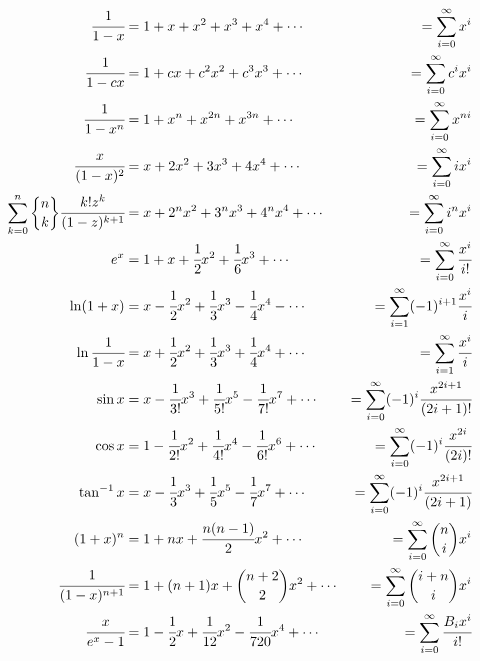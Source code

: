 {\allowdisplaybreaks
\begin{align*}
\cfrac{1}{1 - x}  &=  1 + x + x^2 + x^3 + x^4 + \cdots    &=  \sum_{i=0}^\infty x^i \\
\cfrac{1}{1 - c x}  &=  1 + c x + c^2 x^2 + c^3 x^3 + \cdots  &=  \sum_{i=0}^\infty c^i x^i \\
\cfrac{1}{1 - x^n}  &=  1 + x^n + x^{2n} + x^{3n} + \cdots    &=  \sum_{i=0}^\infty x^{ni} \\
\cfrac{x}{(1 - x)^2}&=  x + 2 x^2 + 3 x^3 + 4 x^4 + \cdots    &=  \sum_{i=0}^\infty i x^i \\
\sum_{k=0}^n \stls{n}{k} \cfrac{k! z^k}{(1-z)^{k+1}}
          &=  x + 2^n x^2 + 3^n x^3 + 4^n x^4 + \cdots
                                &=  \sum_{i=0}^\infty i^n x^i \\
e^x          &= 1 + x + \cfrac{1}{2} x^2 + \cfrac{1}{6} x^3 + \cdots
                                &=  \sum_{i=0}^\infty \cfrac{x^i}{i!} \\
\ln (1 + x)      &=  x - \cfrac{1}{2} x^2 + \cfrac{1}{3} x^3 - \cfrac{1}{4} x^4  - \cdots
                                &=  \sum_{i=1}^\infty (-1)^{i+1} \cfrac{x^i}{i} \\
\ln \cfrac{1}{1 - x}
          &=  x + \cfrac{1}{2} x^2 + \cfrac{1}{3} x^3 + \cfrac{1}{4} x^4  + \cdots
                                &=  \sum_{i=1}^\infty \cfrac{x^i}{i} \\
\sin x        &=  x - \cfrac{1}{3!} x^3  + \cfrac{1}{5!} x^5 - \cfrac{1}{7!} x^7 +  \cdots
                                &=  \sum_{i=0}^\infty (-1)^i \cfrac{x^{2i+1}}{(2i+1)!} \\
\cos x        &=  1 - \cfrac{1}{2!} x^2  + \cfrac{1}{4!} x^4 - \cfrac{1}{6!} x^6 +  \cdots
                                &=  \sum_{i=0}^\infty (-1)^i \cfrac{x^{2i}}{(2i)!} \\
\tan^{-1} x      &=  x - \cfrac{1}{3} x^3  + \cfrac{1}{5} x^5 - \cfrac{1}{7} x^7 +  \cdots
                                &=  \sum_{i=0}^\infty (-1)^i \cfrac{x^{2i+1}}{(2i+1)} \\
(1+x)^n        &=  1 + n x + \cfrac{n(n-1)}{2} x^2 +  \cdots
                                &=  \sum_{i=0}^\infty {n \choose i} x^i \\
\cfrac{1}{(1-x)^{n+1}}
          &=  1 + (n+1) x + {n+2 \choose 2} x^2 +  \cdots
                                &=  \sum_{i=0}^\infty {i+ n \choose i} x^i \\
\cfrac{x}{e^x - 1}  &=  1 - \cfrac{1}{2} x + \cfrac{1}{12} x^2 - \cfrac{1}{720} x^4 + \cdots
                                &=  \sum_{i=0}^\infty \cfrac{B_i x^i}{i!} \\

\end{align*}}
